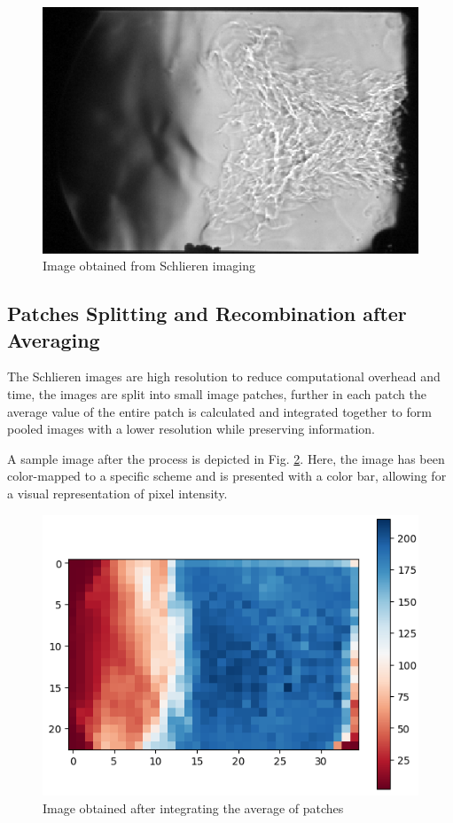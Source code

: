 \documentclass[conference]{IEEEtran}
\begin{document}
	\begin{figure}[H]
	\includegraphics[scale=.51]{plot/flame.png}
	\caption{Image obtained from Schlieren imaging}\label{fig:k2}
\end{figure}	
	
	\subsection{Patches Splitting and Recombination after Averaging}
	The Schlieren images are high resolution to reduce computational overhead and time, the images are split into small image patches, further in each patch the average value of the entire patch is calculated and integrated together to form pooled images with a lower resolution while preserving information.
	
A sample image after the process is depicted in Fig. \ref{fig:k3}. Here, the image has been color-mapped to a specific scheme and is presented with a color bar, allowing for a visual representation of pixel intensity.
	
		\begin{figure}[H]
		\includegraphics[scale=.51]{plot/pool.png}
		\caption{Image obtained after integrating the average of patches}\label{fig:k3}
	\end{figure}
	
\end{document}
